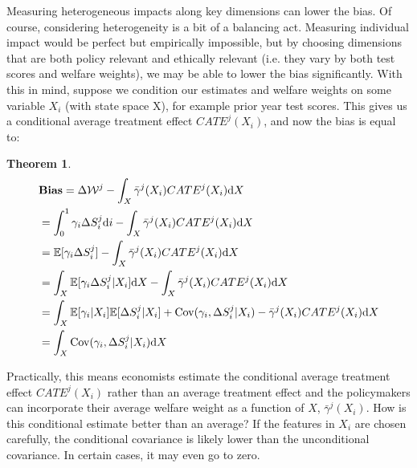 \documentclass[12pt]{article}
\theoremstyle{definition}
\theoremstyle{definition}
\theoremstyle{definition}
\theoremstyle{definition}
\newtheorem{thm}{Theorem}
\begin{document}
 Measuring heterogeneous impacts along key dimensions can lower the bias. Of course, considering heterogeneity is a bit of a balancing act. Measuring individual impact would be perfect but empirically impossible, but by choosing dimensions that are both policy relevant and ethically relevant (i.e. they vary by both test scores and welfare weights), we may be able to lower the bias significantly. With this in mind, suppose we condition our estimates and welfare weights on some variable $X_i$ (with state space X), for example prior year test scores. This gives us a conditional average treatment effect $CATE^j(X_i)$, and now the bias is equal to:



    \begin{thm}
    \label{cond_exp_1}
        \begin{align*}
       & \textbf{Bias} = \Delta \mathcal{W}^j - \int_X \bar{\gamma}^j(X_i) CATE^j(X_i)\text{d}X  \\
       & =   \int_0^1 \gamma_i \Delta S^j_i \text{d}i - \int_X \bar{\gamma}^j(X_i) CATE^j(X_i) \text{d}X   \\
      & =  \mathbb{E}[\gamma_i \Delta S^j_i] - \int_X \bar{\gamma}^j(X_i) CATE^j(X_i) \text{d}X  \\
        & =  \int_X \mathbb{E}[\gamma_i \Delta S^j_i| X_i]\text{d}X - \int_X \bar{\gamma}^j(X_i) CATE^j(X_i)\text{d}X \\
       & = \int_X   \mathbb{E}[\gamma_i| X_i] \mathbb{E}[\Delta S^j_i| X_i] + \mathrm{Cov}(\gamma_i, \Delta S^j_i| X_i) - \bar{\gamma}^j(X_i) CATE^j(X_i)\text{d}X \\
       & = \int_X \mathrm{Cov}(\gamma_i, \Delta S^j_i| X_i)\text{d}X
    \end{align*}
    \end{thm}
    
    Practically, this means economists estimate the conditional average treatment effect $ CATE^j(X_i)$ rather than an average treatment effect and the policymakers can incorporate their average welfare weight as a function of $X$,  $\bar{\gamma}^j(X_i)$.  How is this conditional estimate better than an average? If the features in $X_i$ are chosen carefully, the conditional covariance is likely lower than the unconditional covariance. In certain cases, it may even go to zero. 
    
\end{document}
